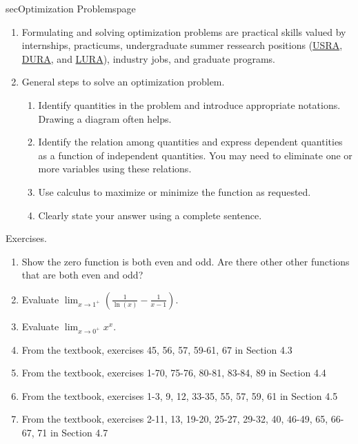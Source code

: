 \documentclass[../main]{subfiles}
\begin{document}
\begin{outline}{sec}{Optimization Problems}{page}
\begin{enumerate}
\begin{enumerate}
      \end{enumerate}
    \item {Formulating and solving optimization problems are practical skills valued by internships, practicums, undergraduate summer ressearch positions (\href{https://www.nserc-crsng.gc.ca/students-etudiants/ug-pc/usra-brpc_eng.asp}{\textsf{USRA}}, \href{https://sfs.yorku.ca/scholarships/award-search?awardID=4405}{\textsf{DURA}}, and \href{https://lassonde.yorku.ca/research/undergraduate-research-at-lassonde}{\textsf{LURA}}), industry jobs, and graduate programs.}
    \item {General steps to solve an optimization problem.
        \begin{enumerate}[label=(\arabic*)]
          \item Identify quantities in the problem and introduce appropriate notations. Drawing a diagram often helps.
          \item Identify the relation among quantities and express dependent quantities as a function of independent quantities.  You may need to eliminate one or more variables using these relations.
          \item Use calculus to maximize or minimize the function as requested. 
          \item Clearly state your answer using a complete sentence.
        \end{enumerate}
      }
\end{enumerate}
\end{outline}



%
%
Exercises.
\begin{enumerate}
\item Show the zero function is both even and odd. Are there other other functions that are both even and odd?
\item Evaluate \({\lim_{x \to 1^{+}}} \left( \frac{1}{\ln(x)} - \frac{1}{x-1} \right)\).
\item Evaluate \({\lim_{x \to 0^{+}}} x^{x}\).
\item From the textbook, exercises  45, 56, 57, 59-61, 67 in Section 4.3%
\item From the textbook, exercises  1-70, 75-76, 80-81, 83-84, 89 in Section 4.4
\item From the textbook, exercises  1-3, 9, 12, 33-35, 55, 57, 59, 61  in Section 4.5%
\item From the textbook, exercises   2-11, 13, 19-20, 25-27, 29-32, 40, 46-49, 65, 66-67, 71 in Section 4.7
\end{enumerate}
\end{document}
